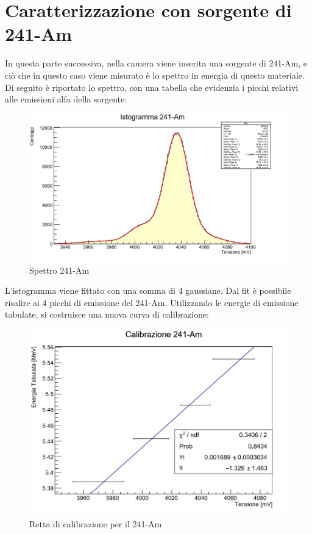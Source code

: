 \documentclass[a4paper,10pt]{article}
\begin{document}
\section{Caratterizzazione con sorgente di 241-Am}
In questa parte successiva, nella camera viene inserita una sorgente di 241-Am, e ciò che in questo caso viene misurato è lo spettro in energia di questo materiale. Di seguito è riportato lo spettro, con una tabella che evidenzia i picchi relativi alle emissioni alfa della sorgente:\\

\begin{figure}[h!]
\centering
\includegraphics[scale=0.5]{istoame.jpg}
\caption{Spettro 241-Am}
\end{figure}

L'istogramma viene fittato con una somma di 4 gaussiane. Dal fit è possibile risalire ai 4 picchi di emissione del 241-Am. Utilizzando le energie di emissione tabulate, si costruisce una nuova curva di calibrazione:\\

\begin{figure}[H]
\centering
\includegraphics[scale=0.5]{rettaame.jpg}
\caption{Retta di calibrazione per il 241-Am}
\end{figure}
\end{document}
